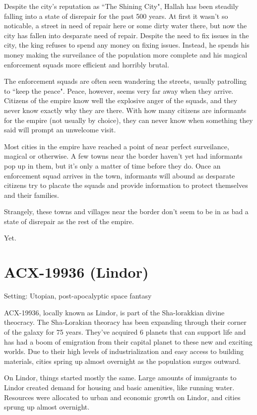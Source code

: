 Despite the city's reputation as ``The Shining City", Hallah has been steadily
falling into a state of disrepair for the past 500 years. At first it wasn't so
noticable, a street in need of repair here or some dirty water there, but
now the city has fallen into desparate need of repair. Despite the need to
fix issues in the city, the king refuses to spend any money on fixing issues.
Instead, he spends his money making the surveilance of the population more
complete and his magical enforcement squads more efficient and horribly brutal.

The enforcement squads are often seen wandering the streets, usually patrolling
to ``keep the peace". Peace, however, seems very far away when they arrive.
Citizens of the empire know well the explosive anger of the squads, and they
never know exactly why they are there. With how many citizens are informants
for the empire (not usually by choice), they can never know when something they
said will prompt an unwelcome visit.

Most cities in the empire have reached a point of near perfect surveilance,
magical or otherwise. A few towns near the border haven't yet had informants
pop up in them, but it's only a matter of time before they do. Once an
enforcement squad arrives in the town, informants will abound as desparate
citizens try to placate the squads and provide information to protect
themselves and their families.

Strangely, these towns and villages near the border don't seem to be in as bad
a state of disrepair as the rest of the empire.

Yet.


\section*{ACX-19936 (Lindor)}

Setting: Utopian, post-apocalyptic space fantasy

ACX-19936, locally known as Lindor, is part of the Sha-lorakkian divine
theocracy. The Sha-Lorakian theoracy has been expanding through their corner
of the galaxy for 75 years. They've acquired 6 planets that can support life
and has had a boom of emigration from their capital planet to these new and
exciting worlds. Due to their high levels of industrialization and easy access
to building materials, cities spring up almost overnight as the population
surges outward.

On Lindor, things started mostly the same. Large amounts of immigrants to
Lindor created demand for housing and basic amenities, like running water.
Resources were allocated to urban and economic growth on Lindor, and cities
sprung up almost overnight.

